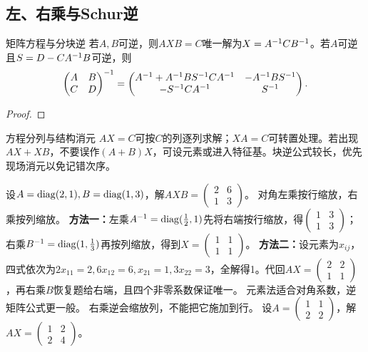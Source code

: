 \subsection{左、右乘与Schur逆}
\begin{theorem}{矩阵方程与分块逆}
若$A,B$可逆，则$AXB=C$唯一解为$X=A^{-1} CB^{-1}$。若$A$可逆且$S=D-CA^{-1} B$可逆，则
\begin{equation}
\begin{pmatrix}A&B\\C&D\end{pmatrix}^{-1}
=\begin{pmatrix}A^{-1}+A^{-1} BS^{-1} CA^{-1}&-A^{-1} BS^{-1}\\-S^{-1} CA^{-1}&S^{-1}\end{pmatrix}.\label{eq:blockinverse}
\end{equation}
\end{theorem}
\begin{proof}

\end{proof}
\begin{method}{方程分列与结构消元}
$AX=C$可按$C$的列逐列求解；$XA=C$可转置处理。若出现$AX+XB$，不要误作$(A+B)X$，可设元素或进入特征基。块逆公式较长，优先现场消元以免记错次序。
\end{method}
{设$A=\operatorname{diag}(2,1),B=\operatorname{diag}(1,3)$，解$AXB=\begin{pmatrix}2&6\\1&3\end{pmatrix}$。}
{对角左乘按行缩放，右乘按列缩放。}
{\textbf{方法一：}左乘$A^{-1}=\operatorname{diag}(\frac{1}{2},1)$先将右端按行缩放，得$\begin{pmatrix}1&3\\1&3\end{pmatrix}$；右乘$B^{-1}=\operatorname{diag}(1,\frac{1}{3})$再按列缩放，得到$X=\begin{pmatrix}1&1\\1&1\end{pmatrix}$。
\textbf{方法二：}设元素为$x_{ij}$，四式依次为$2x_{11}=2,6x_{12}=6,x_{21}=1,3x_{22}=3$，全解得1。代回$AX=\begin{pmatrix}2&2\\1&1\end{pmatrix}$，再右乘$B$恢复题给右端，且四个非零系数保证唯一。}
{元素法适合对角系数，逆矩阵公式更一般。}
{右乘逆会缩放列，不能把它施加到行。}
{设$A=\begin{pmatrix}1&1\\2&2\end{pmatrix}$，解$AX=\begin{pmatrix}1&2\\2&4\end{pmatrix}$。}
